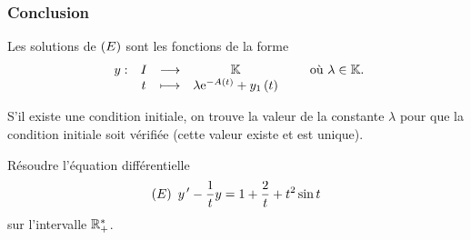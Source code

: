 \subsubsection{Conclusion}

Les solutions de \(\left(E\right)\) sont les fonctions de la forme \[\begin{array}[t]{cccc}y : & I & \longrightarrow & \mathbb{K} \\ & t & \longmapsto & \lambda\mathrm{e}^{-A\left(t\right)}+y_1\left(t\right)\end{array}\qquad\text{où }\lambda\in\mathbb{K}.\]

S'il existe une condition initiale, on trouve la valeur de la constante \(\lambda\) pour que la condition initiale soit vérifiée (cette valeur existe et est unique).

\begin{exoex}
Résoudre l'équation différentielle \[\left(E\right)~y^{\,\prime}-\dfrac{1}{t}y=1+\dfrac{2}{t}+t^2\sin t\] sur l'intervalle \(\mathbb{R}_+^*\).
\end{exoex}

